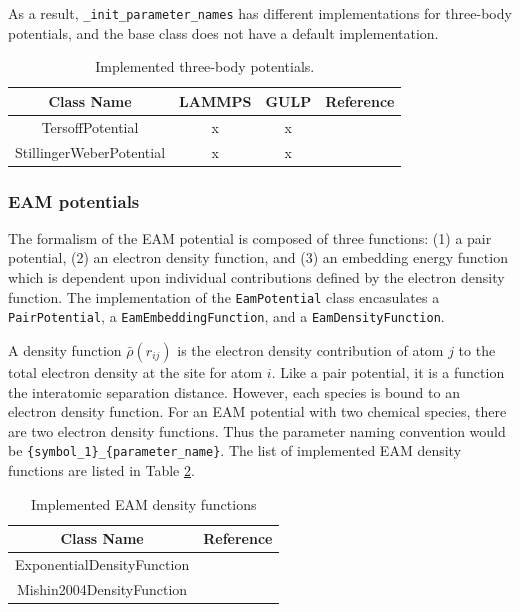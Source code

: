 As a result, \verb|_init_parameter_names| has different implementations for three-body potentials, and the base class does not have a default implementation.

\begin{table}[ht]
	\centering
	\caption{Implemented three-body potentials.}
	\label{tbl:pypospack_threebody_potentials}
	\begin{tabular}{cccc}
		\hline
		{Class Name} & LAMMPS & GULP & Reference \\
		\hline
		TersoffPotential & x & x & \cite{tersoff1988_tersoff} \\
		StillingerWeberPotential & x & x &\cite{stillinger1985_sw} \\
		\hline
	\end{tabular}
\end{table}

\subsubsection{EAM potentials}

The formalism of the EAM potential is composed of three functions: (1) a pair potential, (2) an electron density function, and (3) an embedding energy function which is dependent upon individual contributions defined by the electron density function.
The implementation of the \verb|EamPotential| class encasulates a \verb|PairPotential|, a \verb|EamEmbeddingFunction|, and a \verb|EamDensityFunction|.

  A density function $\bar{\rho}(r_{ij})$ is the electron density contribution of atom $j$ to the total electron density at the site for atom $i$.  Like a pair potential, it is a function the interatomic separation distance.  However, each species is bound to an electron density function.  For an EAM potential with two chemical species, there are two electron density functions.  Thus the parameter naming convention would be \verb|{symbol_1}_{parameter_name}|.
	The list of implemented EAM density functions are listed in Table \ref{tbl:pypospack_eam_density_function}.

\begin{table}[ht]
	\centering
	\caption{Implemented EAM density functions}
	\label{tbl:pypospack_eam_density_function}
	\begin{tabular}{cc}
		\hline
		{Class Name} & {Reference} \\
		\hline
		ExponentialDensityFunction & \\
		Mishin2004DensityFunction & \cite{mishin2004_eam_NiAl} \\
		\hline
	\end{tabular}
\end{table}

